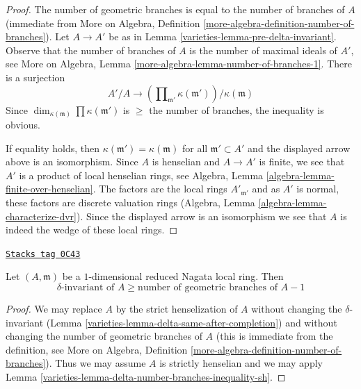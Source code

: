 \begin{proof}

The number of geometric branches is equal to the number of branches of $A$
(immediate from
More on Algebra, Definition \ref{more-algebra-definition-number-of-branches}).
Let $A \to A'$ be as in Lemma \ref{varieties-lemma-pre-delta-invariant}.
Observe that the number of branches of $A$ is the number
of maximal ideals of $A'$, see
More on Algebra, Lemma \ref{more-algebra-lemma-number-of-branches-1}.
There is a surjection
$$
A'/A \longrightarrow
\left(\prod\nolimits_{\mathfrak m'} \kappa(\mathfrak m')\right)/
\kappa(\mathfrak m)
$$
Since $\dim_{\kappa(\mathfrak m)} \prod \kappa(\mathfrak m')$
is $\geq$ the number of branches, the inequality is obvious.

\medskip\noindent
If equality holds, then $\kappa(\mathfrak m') = \kappa(\mathfrak m)$
for all $\mathfrak m' \subset A'$ and the displayed arrow above
is an isomorphism. Since $A$ is henselian and
$A \to A'$ is finite, we see that $A'$ is a product of local
henselian rings, see Algebra, Lemma \ref{algebra-lemma-finite-over-henselian}.
The factors are the local rings $A'_{\mathfrak m'}$ and as
$A'$ is normal, these factors are discrete valuation rings
(Algebra, Lemma \ref{algebra-lemma-characterize-dvr}).
Since the displayed arrow is an isomorphism we see that
$A$ is indeed the wedge of these local rings.
\end{proof}

\begin{lemma}
\label{varieties-lemma-delta-number-branches-inequality}
\href{https://stacks.math.columbia.edu/tag/0C43}{\texttt{Stacks tag 0C43}}

Let $(A, \mathfrak m)$ be a $1$-dimensional reduced Nagata local ring. Then
$$
\delta\text{-invariant of }A \geq \text{number of geometric branches of }A - 1
$$
\end{lemma}

\begin{proof}

We may replace $A$ by the strict henselization of $A$ without
changing the $\delta$-invariant
(Lemma \ref{varieties-lemma-delta-same-after-completion}) and
without changing the number of geometric branches of $A$
(this is immediate from the definition, see
More on Algebra, Definition \ref{more-algebra-definition-number-of-branches}).
Thus we may assume $A$ is strictly henselian and we may
apply Lemma \ref{varieties-lemma-delta-number-branches-inequality-sh}.
\end{proof}

